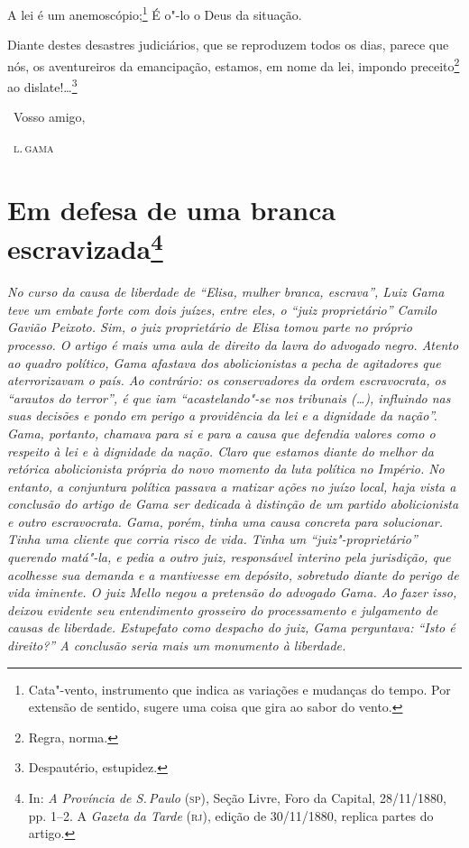 A lei é um anemoscópio;\footnote{Cata"-vento, instrumento que indica as
  variações e mudanças do tempo. Por extensão de sentido, sugere uma
  coisa que gira ao sabor do vento.} É o"-lo o Deus da situação.

Diante destes desastres judiciários, que se reproduzem todos os dias,
parece que nós, os aventureiros da emancipação, estamos, em nome da lei,
impondo preceito\footnote{Regra, norma.} ao dislate!\ldots{}\footnote{
  Despautério, estupidez.}

\bigskip

\hfill\ Vosso amigo,

\hfill\ \textsc{l.\,gama}

\chapter{Em defesa de uma branca escravizada\footnote[*]{In: \emph{A Província de S.\,Paulo} (\textsc{sp}), Seção Livre, Foro da Capital, 28/11/1880, pp. 1--2. A
  \emph{Gazeta da Tarde} (\textsc{rj}), edição de 30/11/1880, replica
  partes do artigo.}}

\begin{flushleft}
{\footnotesize\itshape
No curso da causa de liberdade de
``Elisa, mulher branca, escrava'', Luiz Gama teve um embate forte com dois
juízes, entre eles, o ``juiz proprietário'' Camilo Gavião Peixoto. Sim, o
juiz proprietário de Elisa tomou parte no próprio processo. O artigo é
mais uma aula de direito da lavra do advogado negro. Atento ao quadro
político, Gama afastava dos abolicionistas a pecha de agitadores que
aterrorizavam o país. Ao contrário: os conservadores da ordem
escravocrata, os ``arautos do terror'', é que iam ``acastelando"-se nos
tribunais (\ldots{}), influindo nas suas decisões e pondo em perigo a
providência da lei e a dignidade da nação''. Gama, portanto, chamava para
si e para a causa que defendia valores como o respeito à lei e à
dignidade da nação. Claro que estamos diante do melhor da retórica
abolicionista própria do novo momento da luta política no Império. No
entanto, a conjuntura política passava a matizar ações no juízo local,
haja vista a conclusão do artigo de Gama ser dedicada à distinção de um
partido abolicionista e outro escravocrata. Gama, porém, tinha uma causa
concreta para solucionar. Tinha uma cliente que corria risco de vida.
Tinha um ``juiz"-proprietário'' querendo matá"-la, e pedia
a outro juiz, responsável interino pela jurisdição, que
acolhesse sua demanda e a mantivesse em depósito, sobretudo diante do
perigo de vida iminente. O juiz Mello negou a pretensão do advogado
Gama. Ao fazer isso, deixou evidente seu entendimento grosseiro
do processamento e julgamento de causas de liberdade. Estupefato como
despacho do juiz, Gama perguntava: ``Isto é direito?''
A conclusão seria mais um monumento à liberdade.}
\end{flushleft}

